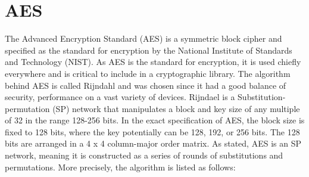 \documentclass[a4paper, openany]{book}
\begin{document}
\section{AES}
\label{AESalg}
The Advanced Encryption Standard (AES) is a symmetric block cipher and specified as the standard for encryption by the National Institute of Standards and Technology (NIST). As AES is the standard for encryption, it is used chiefly everywhere and is critical to include in a cryptographic library. The algorithm behind AES is called Rijndahl and was chosen since it had a good balance of security, performance on a vast variety of devices\cite{AESofficial}. Rijndael is a Substitution-permutation (SP) network that manipulates a block and key size of any multiple of 32 in the range 128-256 bits. In the exact specification of AES, the block size is fixed to 128 bits, where the key potentially can be 128, 192, or 256 bits. The 128 bits are arranged in a 4 x 4 column-major order matrix. As stated, AES is an SP network, meaning it is constructed as a series of rounds of substitutions and permutations. More precisely, the algorithm is listed as follows:
\end{document}
